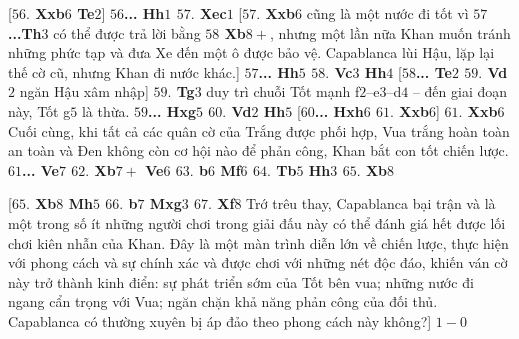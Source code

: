 \begin{multicols}{2}
	\vskip 0.1cm
	[\textbf{\color{gocco}$56.$ Xxb$6$ Te$2$}]
	\vskip 0.1cm
	\textbf{\color{gocco}$56$... Hh$1$ $57.$ Xec$1$}
	\vskip 0.1cm
	[\textbf{\color{gocco}$57.$ Xxb$6$} cũng là một nước đi tốt vì \textbf{\color{gocco}$57$...Th$3$} có thể được trả lời bằng \textbf{\color{gocco}$58$ Xb$8+$}, nhưng một lần nữa Khan muốn tránh những phức tạp và đưa Xe đến một ô được bảo vệ. Capablanca lùi Hậu, lặp lại thế cờ cũ, nhưng Khan đi nước khác.]
	\vskip 0.1cm
	\textbf{\color{gocco}$57$... Hh$5$ $58.$ Vc$3$ Hh$4$}
	\vskip 0.1cm
	[\textbf{\color{gocco}$58$... Te$2$ $59.$ Vd$2$} ngăn Hậu xâm nhập]
	\vskip 0.1cm
	\textbf{\color{gocco}$59.$ Tg$3$} duy trì chuỗi Tốt mạnh f$2$--e$3$--d$4$ -- đến giai đoạn này, Tốt g$5$ là thừa.
	\vskip 0.1cm
	\textbf{\color{gocco}$59$... Hxg$5$ $60.$ Vd$2$ Hh$5$}
	\vskip 0.1cm
	[\textbf{\color{gocco}$60$... Hxh$6$ $61.$ Xxb$6$}]
	\vskip 0.1cm
	\textbf{\color{gocco}$61.$ Xxb$6$} Cuối cùng, khi tất cả các quân cờ của Trắng được phối hợp, Vua trắng hoàn toàn an toàn và Đen không còn cơ hội nào để phản công, Khan bắt con tốt chiến lược. \textbf{\color{gocco}$61$... Ve$7$ $62.$ Xb$7+$ Ve$6$ $63.$ b$6$ Mf$6$ $64.$ Tb$5$ Hh$3$ $65.$ Xb$8$}
	\begin{center}
		\newgame
		\scalebox{0.9}\showboard
	\end{center}
	[\textbf{\color{gocco}$65.$ Xb$8$ Mh$5$ $66.$ b$7$ Mxg$3$ $67.$ Xf$8$} Trớ trêu thay, Capablanca bại trận và là một trong số ít những người chơi trong giải đấu này có thể đánh giá hết được lối chơi kiên nhẫn của Khan. Đây là một màn trình diễn lớn về chiến lược, thực hiện với phong cách và sự chính xác và được chơi với những nét độc đáo, khiến ván cờ này  trở thành kinh điển: sự phát triển sớm của Tốt bên vua; những nước đi ngang cẩn trọng với Vua; ngăn chặn khả năng phản công của đối thủ. Capablanca có thường xuyên bị áp đảo theo phong cách này không?]
	\vskip 0.1cm
	$1-0$
\end{multicols}





